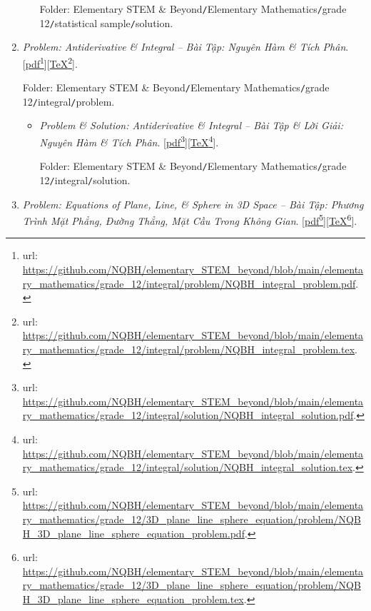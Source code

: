 \documentclass[12pt,twoside]{book}
\begin{document}
\begin{enumerate}
\begin{itemize}
		Folder: {\sf Elementary STEM \& Beyond{\tt/}Elementary Mathematics{\tt/}grade 12{\tt/}statistical sample{\tt/}solution}.
	\end{itemize}
	\item {\it Problem: Antiderivative \& Integral -- Bài Tập: Nguyên Hàm \& Tích Phân}. [\href{https://github.com/NQBH/elementary_STEM_beyond/blob/main/elementary_mathematics/grade_12/integral/problem/NQBH_integral_problem.pdf}{pdf}\footnote{{\sc url}: \url{https://github.com/NQBH/elementary_STEM_beyond/blob/main/elementary_mathematics/grade_12/integral/problem/NQBH_integral_problem.pdf}.}][\href{https://github.com/NQBH/elementary_STEM_beyond/blob/main/elementary_mathematics/grade_12/integral/problem/NQBH_integral_problem.tex}{\TeX}\footnote{{\sc url}: \url{https://github.com/NQBH/elementary_STEM_beyond/blob/main/elementary_mathematics/grade_12/integral/problem/NQBH_integral_problem.tex}.}].
	
	Folder: {\sf Elementary STEM \& Beyond{\tt/}Elementary Mathematics{\tt/}grade 12{\tt/}integral{\tt/}problem}.
	\begin{itemize}
		\item {\it Problem \& Solution: Antiderivative \& Integral -- Bài Tập \& Lời Giải: Nguyên Hàm \& Tích Phân}. [\href{https://github.com/NQBH/elementary_STEM_beyond/blob/main/elementary_mathematics/grade_12/integral/solution/NQBH_integral_solution.pdf}{pdf}\footnote{{\sc url}: \url{https://github.com/NQBH/elementary_STEM_beyond/blob/main/elementary_mathematics/grade_12/integral/solution/NQBH_integral_solution.pdf}.}][\href{https://github.com/NQBH/elementary_STEM_beyond/blob/main/elementary_mathematics/grade_12/integral/solution/NQBH_integral_solution.tex}{\TeX}\footnote{{\sc url}: \url{https://github.com/NQBH/elementary_STEM_beyond/blob/main/elementary_mathematics/grade_12/integral/solution/NQBH_integral_solution.tex}.}].
		
		Folder: {\sf Elementary STEM \& Beyond{\tt/}Elementary Mathematics{\tt/}grade 12{\tt/}integral{\tt/}solution}.
	\end{itemize}
	\item {\it Problem: Equations of Plane, Line, {\it\&} Sphere in 3D Space -- Bài Tập: Phương Trình Mặt Phẳng, Đường Thẳng, Mặt Cầu Trong Không Gian}. [\href{https://github.com/NQBH/elementary_STEM_beyond/blob/main/elementary_mathematics/grade_12/3D_plane_line_sphere_equation/problem/NQBH_3D_plane_line_sphere_equation_problem.pdf}{pdf}\footnote{{\sc url}: \url{https://github.com/NQBH/elementary_STEM_beyond/blob/main/elementary_mathematics/grade_12/3D_plane_line_sphere_equation/problem/NQBH_3D_plane_line_sphere_equation_problem.pdf}.}][\href{https://github.com/NQBH/elementary_STEM_beyond/blob/main/elementary_mathematics/grade_12/3D_plane_line_sphere_equation/problem/NQBH_3D_plane_line_sphere_equation_problem.tex}{\TeX}\footnote{{\sc url}: \url{https://github.com/NQBH/elementary_STEM_beyond/blob/main/elementary_mathematics/grade_12/3D_plane_line_sphere_equation/problem/NQBH_3D_plane_line_sphere_equation_problem.tex}.}].
	

\end{enumerate}
\end{document}
